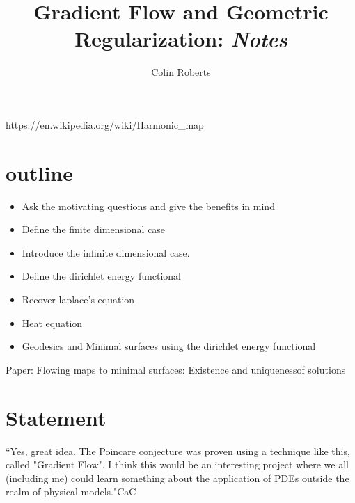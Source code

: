\documentclass[12pt]{report} %
\title{Gradient Flow and Geometric Regularization: \emph{Notes}}
\author{Colin Roberts}
\theoremstyle{definition}
\begin{document}
\maketitle

https://en.wikipedia.org/wiki/Harmonic_map

\section{outline}


\begin{itemize}
    \item Ask the motivating questions and give the benefits in mind
    \item Define the finite dimensional case
    \item Introduce the infinite dimensional case.
    \item Define the dirichlet energy functional
    \item Recover laplace's equation
    \item Heat equation
    \item Geodesics and Minimal surfaces using the dirichlet energy functional
\end{itemize}

Paper: Flowing maps to minimal surfaces: Existence and uniquenessof solutions

\section{Statement}

``Yes, great idea. The Poincare conjecture was proven using a technique
like this, called "Gradient Flow". I think this would be an interesting
project where we all (including me) could learn something about the
application of PDEs outside the realm of physical models."CaC
\end{document}
